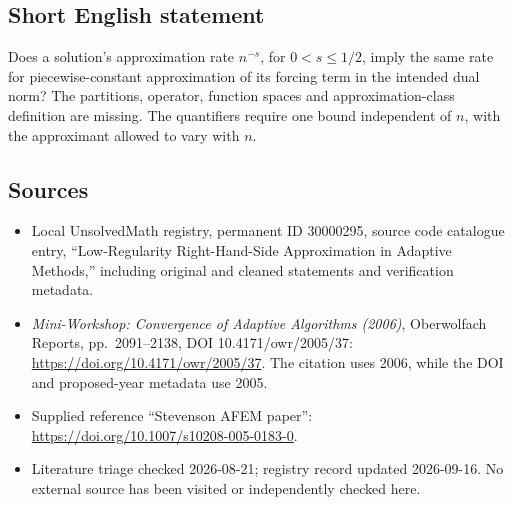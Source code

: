 \documentclass[11pt]{article}
\begin{document}
\subsection{Short English statement}
Does a solution's approximation rate \(n^{-s}\), for \(0<s\leq1/2\), imply the same rate for piecewise-constant approximation of its forcing term in the intended dual norm? The partitions, operator, function spaces and approximation-class definition are missing. The quantifiers require one bound independent of \(n\), with the approximant allowed to vary with \(n\).
\subsection{Sources}
\begin{itemize}
\item Local UnsolvedMath registry, permanent ID 30000295, source code catalogue entry, ``Low-Regularity Right-Hand-Side Approximation in Adaptive Methods,'' including original and cleaned statements and verification metadata.
\item \emph{Mini-Workshop: Convergence of Adaptive Algorithms (2006)}, Oberwolfach Reports, pp.\ 2091--2138, DOI 10.4171/owr/2005/37: \url{https://doi.org/10.4171/owr/2005/37}. The citation uses 2006, while the DOI and proposed-year metadata use 2005.
\item Supplied reference ``Stevenson AFEM paper'': \url{https://doi.org/10.1007/s10208-005-0183-0}.
\item Literature triage checked 2026-08-21; registry record updated 2026-09-16. No external source has been visited or independently checked here.
\end{itemize}
\end{document}
